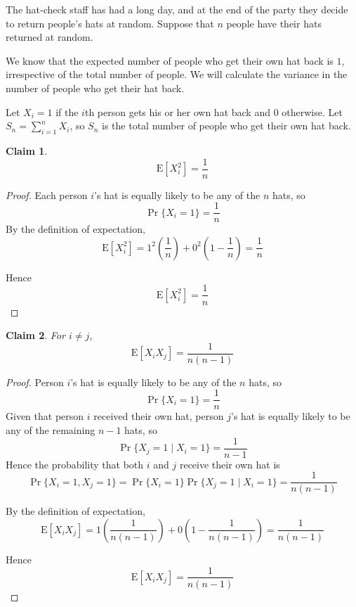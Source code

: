 \documentclass{article}
\newtheorem{claim}{Claim}
\begin{document}
The hat-check staff has had a long day, and at the end of the party they decide to return people's hats 
at random. Suppose that $n$ people have their hats returned at random. 

\medskip

We know that the expected number of people who get their own hat back is $1$, irrespective of the total 
number of people. We will calculate the variance in the number of people who get their hat back.

\medskip

Let $X_i = 1$ if the $i$th person gets his or her own hat back and $0$ otherwise. Let 
$S_n = \sum_{i=1}^{n}X_i$, so $S_n$ is the total number of people who get their own hat back.

\begin{claim}
    \[
    \mathrm{E}[X_i^2] = \frac{1}{n}
    \]
\end{claim}

\begin{proof}
    Each person $i$'s hat is equally likely to be any of the $n$ hats, so
    \[
    \Pr\{X_i = 1\} = \frac{1}{n}
    \]
    By the definition of expectation,
    \[
    \mathrm{E}[X_i^2] = 1^2\left(\frac{1}{n}\right) + 0^2\left(1 - \frac{1}{n}\right) = \frac{1}{n}
    \]

    \medskip

    Hence 
    \[
    \mathrm{E}[X_i^2] = \frac{1}{n}
    \]
\end{proof}

\begin{claim}
    For $i \neq j$,
    \[
    \mathrm{E}[X_iX_j] = \frac{1}{n(n-1)}
    \]
\end{claim}

\begin{proof}
    Person $i$'s hat is equally likely to be any of the $n$ hats, so
    \[
    \Pr\{X_i = 1\} = \frac{1}{n}
    \]
    Given that person $i$ received their own hat, person $j$'s hat is equally likely to be any of the 
    remaining $n-1$ hats, so
    \[
    \Pr\{X_j = 1 \mid X_i = 1\} = \frac{1}{n-1}
    \]
    Hence the probability that both $i$ and $j$ receive their own hat is
    \[
    \Pr\{X_i = 1, X_j = 1\} = \Pr\{X_i = 1\}\Pr\{X_j = 1 \mid X_i = 1\} = \frac{1}{n(n-1)}
    \]

    \medskip

    By the definition of expectation,
    \[
    \mathrm{E}[X_iX_j] = 1\left(\frac{1}{n(n-1)}\right) + 0\left(1 - \frac{1}{n(n-1)}\right) 
    = \frac{1}{n(n-1)}
    \]
    
    \medskip

    Hence 
    \[
    \mathrm{E}[X_iX_j] = \frac{1}{n(n-1)}
    \]
\end{proof}
\end{document}

